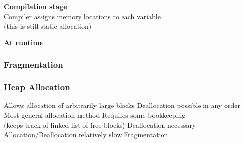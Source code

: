 \documentclass{../ucll-slides}
\begin{document}
\begin{frame}
\begin{columns}
\begin{center}
    \end{center}
  \end{columns}
  \vskip2cm
  \begin{overprint}
    \begin{center}
      \textbf{Compilation stage} \\ Compiler assigns memory locations to each variable \\ (this is still static allocation)
    \end{center}

    \begin{center}
      \textbf{At runtime}
    \end{center}
  \end{overprint}
\end{frame}

\begin{frame}
  \frametitle{Fragmentation}
  \begin{center}
  \end{center}
\end{frame}

\begin{frame}
  \frametitle{Heap Allocation}
  \begin{procontralist}
    \pro Allows allocation of arbitrarily large blocks
    \pro Deallocation possible in any order
    \pro Most general allocation method
    \con Requires some bookkeeping \\ (keeps track of linked list of free blocks)
    \con Deallocation necessary
    \con Allocation/Deallocation relatively slow
    \con Fragmentation
  \end{procontralist}
\end{frame}
\end{document}
